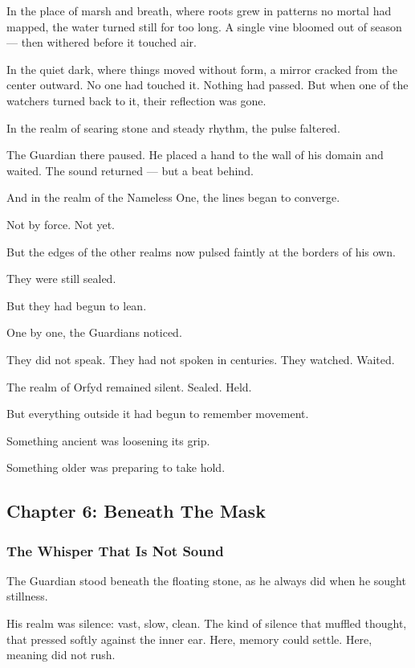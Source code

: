 \documentclass[12pt]{article}
\begin{document}
In the place of marsh and breath, where roots grew in patterns no mortal had mapped, the water turned still for too long. A single vine bloomed out of season — then withered before it touched air.

In the quiet dark, where things moved without form, a mirror cracked from the center outward. No one had touched it. Nothing had passed. But when one of the watchers turned back to it, their reflection was gone.

In the realm of searing stone and steady rhythm, the pulse faltered.

The Guardian there paused. He placed a hand to the wall of his domain and waited. The sound returned — but a beat behind.

And in the realm of the Nameless One, the lines began to converge.

Not by force. Not yet.

But the edges of the other realms now pulsed faintly at the borders of his own.

They were still sealed.

But they had begun to lean.

One by one, the Guardians noticed.

They did not speak. They had not spoken in centuries. They watched. Waited.

The realm of Orfyd remained silent. Sealed. Held.

But everything outside it had begun to remember movement.

Something ancient was loosening its grip.

Something older was preparing to take hold.



\newpage

\subsection*{Chapter 6: Beneath The Mask}

\vspace{.5in}

\subsubsection*{The Whisper That Is Not Sound}

The Guardian stood beneath the floating stone, as he always did when he sought stillness.

His realm was silence: vast, slow, clean. The kind of silence that muffled thought, that pressed softly against the inner ear. Here, memory could settle. Here, meaning did not rush.
\end{document}
